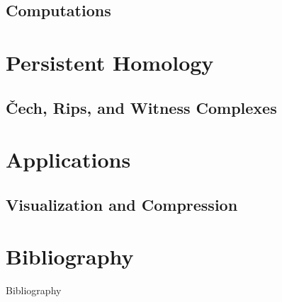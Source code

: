 \subsection{Computations}
\begin{frame}
\end{frame}


\section[Persistence]{Persistent Homology}
\subsection{\v{C}ech, Rips, and Witness Complexes}
\begin{frame}
\end{frame}

\section{Applications}
\subsection{Visualization and Compression}
\begin{frame}
\end{frame}

\section*{Bibliography}
\begin{frame}{Bibliography}
	\nocite{wagner}
	\nocite{hatcher}
	\nocite{singh}
	\begingroup
	\renewcommand{\section}[2]{}%
	
	\endgroup
\end{frame}





